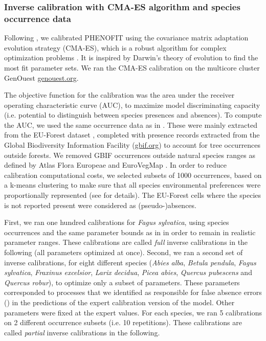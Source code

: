 \documentclass[letterpaper,8pt]{extarticle}  %
\begin{document}
\begin{doublespacing}
\begin{linenumbers}
\subsubsection{Inverse calibration with CMA-ES algorithm and species occurrence data}

Following \citet{VanderMeersch2023}, we calibrated PHENOFIT using the covariance matrix adaptation evolution strategy (CMA-ES), which  is a robust algorithm for complex optimization problems \citep{Hansen2001}. It is inspired by Darwin's theory of evolution to find the most fit parameter sets. We ran the CMA-ES calibration on the multicore cluster GenOuest \url{genouest.org}.

The objective function for the calibration was the area under the receiver operating characteristic curve (AUC), to maximize model discriminating capacity (i.e. potential to distinguish between species presences and absences). To compute the AUC, we used the same occurrence data as in \citep{VanderMeersch2023}. These were mainly extracted from the EU-Forest dataset \citep{Mauri2017}, completed with presence records extracted from the Global Biodiversity Information Facility (\url{gbif.org}) to account for tree occurrences outside forests. We removed GBIF occurrences outside natural species ranges as defined by Atlas Flora Europeae \citep{AFE2005} and EuroVegMap \citep{EVM2003}. In order to reduce calibration computational costs, we selected subsets of 1000 occurrences,  based on a k-means clustering to make sure that all species environmental preferences were proportionally represented (see \citet{VanderMeersch2023} for details). The EU-Forest cells where the species is not reported present were considered as (pseudo-)absences.

First, we ran one hundred calibrations for \emph{Fagus sylvatica}, using species occurrences and the same parameter bounds as in \citet{VanderMeersch2023} in order to remain in realistic parameter ranges. These calibrations are called \emph{full} inverse calibrations in the following (all parameters optimized at once). Second, we ran a second set of inverse calibrations, for eight different species (\emph{Abies alba}, \emph{Betula pendula}, \emph{Fagus sylvatica}, \emph{Fraxinus excelsior}, \emph{Larix decidua}, \emph{Picea abies}, \emph{Quercus pubescens} and \emph{Quercus robur}), to optimize only a subset of parameters. These parameters corresponded to processes that we identified as responsible for false absence errors () in the predictions of the expert calibration version of the model. Other parameters were fixed at the expert values. For each species, we ran 5 calibrations on 2 different occurrence subsets (i.e. 10 repetitions). These calibrations are called \emph{partial} inverse calibrations in the following. 


\end{linenumbers}
\end{doublespacing}
\end{document}
